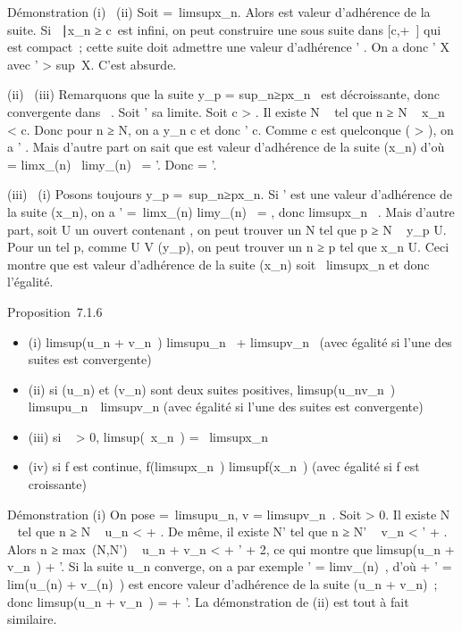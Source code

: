 \documentclass[]{article}
\begin{document}
Démonstration (i) \rigtharrow~(ii) Soit \ell =\
limsupx_n. Alors \ell est valeur d'adhérence de la suite. Si
\n \in {}~∣x_n ≥
c\ est infini, on peut construire une sous suite dans
[c,+\infty~] qui est compact~; cette suite doit admettre une valeur
d'adhérence \ell' \in [c,+\infty~]. On a donc \ell' \in X avec \ell'
> sup~X. C'est absurde.

(ii) \rigtharrow~(iii) Remarquons que la suite y_p
= sup_n≥px_n~ est
décroissante, donc convergente dans \overline{}~. Soit
\ell' sa limite. Soit c > \ell. Il existe N \in {}~ tel que n ≥ N \rigtharrow~
x_n < c. Donc pour n ≥ N, on a y_n \leq c et
donc \ell' \leq c. Comme c est quelconque ( > \ell), on a \ell' \leq \ell.
Mais d'autre part on sait que \ell est valeur d'adhérence de la suite
(x_n) d'où \ell = limx_\phi(n)~
\leq limy_\phi(n)~ = \ell'. Donc \ell = \ell'.

(iii) \rigtharrow~(i) Posons toujours y_p =\
sup_n≥px_n. Si \ell' est une valeur d'adhérence de la
suite (x_n), on a \ell' =\
limx_\phi(n) \leq limy_\phi(n)~ = \ell,
donc limsupx_n~ \leq \ell. Mais d'autre
part, soit U un ouvert contenant \ell, on peut trouver un N tel que p ≥ N \rigtharrow~
y_p \in U. Pour un tel p, comme U \in V (y_p), on peut
trouver un n ≥ p tel que x_n \in U. Ceci montre que \ell est valeur
d'adhérence de la suite (x_n) soit \ell \leq\
limsupx_n et donc l'égalité.

Proposition~7.1.6

\begin{itemize}
\itemsep1pt\parskip0pt
\item
  (i) limsup(u_n + v_n~)
  \leq limsupu_n~
  + limsupv_n~ (avec égalité si l'une
  des suites est convergente)
\item
  (ii) si (u_n) et (v_n) sont deux suites positives,
  limsup(u_nv_n~)
  \leq limsupu_n~\
  limsupv_n (avec égalité si l'une des suites est
  convergente)
\item
  (iii) si \lambda~ > 0,
  limsup(\lambda~x_n~) =
  \lambda~limsupx_n~
\item
  (iv) si f est continue,
  f(limsupx_n~)
  \leq limsupf(x_n~) (avec égalité si f
  est croissante)
\end{itemize}

Démonstration (i) On pose \ell =\
limsupu_n, v = limsupv_n~.
Soit \epsilon > 0. Il existe N \in {}~ tel que n ≥ N \rigtharrow~ u_n
< \ell + \epsilon. De même, il existe N' tel que n ≥ N' \rigtharrow~ v_n
< \ell' + \epsilon. Alors n ≥ max~(N,N') \rigtharrow~
u_n + v_n < \ell + \ell' + 2\epsilon, ce qui montre que
limsup(u_n + v_n~) \leq \ell + \ell'.
Si la suite u_n converge, on a par exemple \ell'
= limv_\phi(n)~, d'où \ell + \ell'
= lim(u_\phi(n) + v_\phi(n)~) est
encore valeur d'adhérence de la suite (u_n + v_n)~;
donc limsup(u_n + v_n~) = \ell +
\ell'. La démonstration de (ii) est tout à fait similaire.
\end{document}

